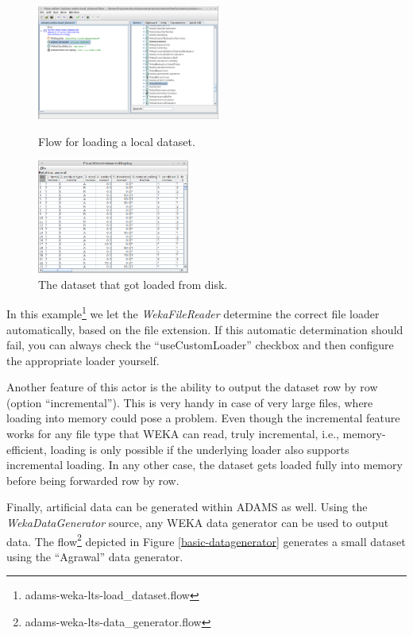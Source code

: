 \begin{figure}[ht]
  \begin{minipage}[t]{0.5\linewidth}
    \centering
    \includegraphics[width=6.0cm]{images/basic-load_local_dataset.png}
    \caption{Flow for loading a local dataset.}
    \label{basic-load_local_dataset}
  \end{minipage}
  \hspace{0.5cm}
  \begin{minipage}[t]{0.5\linewidth}
    \centering
    \includegraphics[width=5.0cm]{images/basic-load_local_dataset-output.png}
    \caption{The dataset that got loaded from disk.}
    \label{basic-load_local_dataset-output}
  \end{minipage}
\end{figure}

In this example\footnote{adams-weka-lts-load\_dataset.flow} we let the
\textit{WekaFileReader} determine the correct file loader automatically, based
on the file extension. If this automatic determination should fail, you can
always check the ``useCustomLoader'' checkbox and then configure the appropriate
loader yourself.

Another feature of this actor is the ability to output the dataset row by row
(option ``incremental''). This is very handy in case of very large files, where
loading into memory could pose a problem. Even though the incremental feature
works for any file type that WEKA can read, truly incremental, i.e.,
memory-efficient, loading is only possible if the underlying loader also
supports incremental loading. In any other case, the dataset gets loaded fully
into memory before being forwarded row by row.

Finally, artificial data can be generated within ADAMS as well. Using the
\textit{WekaDataGenerator} source, any WEKA data generator can be used to output
data. The flow\footnote{adams-weka-lts-data\_generator.flow} depicted in Figure
\ref{basic-datagenerator} generates a small dataset using the ``Agrawal'' data
generator.

